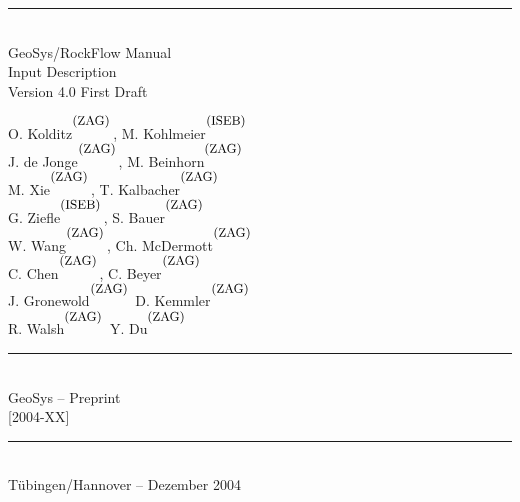 \begin{center}
\vspace{1cm}

%


\rule{12cm}{.15mm}
\\[10mm]
{\TibSF GeoSys/RockFlow Manual \\[3mm]
 Input Description \\[3mm]
 Version 4.0 First Draft \\[7mm]
}


{
%
\def \MarkISEB {$^{^{^{\small\mbox{(ISEB)}}}}$}
\def \MarkZAG {$^{^{^{\small\mbox{(ZAG)}}}}$}
{\TibsF O. Kolditz\MarkZAG,  %
        M. Kohlmeier\MarkISEB   %
 \\[2mm]
        J. de Jonge\MarkZAG,    %
        M. Beinhorn\MarkZAG     %
 \\[2mm]
        M. Xie\MarkZAG,         %
        T. Kalbacher\MarkZAG    %
 \\[2mm]
        G. Ziefle\MarkISEB,     %
        S. Bauer\MarkZAG        %
 \\[2mm]
        W. Wang\MarkZAG,        %
        Ch. McDermott\MarkZAG   %
 \\[2mm]
        C. Chen\MarkZAG,        %
        C. Beyer\MarkZAG        %
 \\[2mm]
        J. Gronewold\MarkZAG    %
        D. Kemmler\MarkZAG      %
 \\[2mm]
        R. Walsh\MarkZAG        %
        Y. Du\MarkZAG           %
\\[8mm]
}
%
}
\rule{12cm}{0.15mm}
\\[7mm]

%
\vfill
%
{\TibSF GeoSys -- Preprint
\\[2mm]
[2004-XX] }
\\[6mm]

\rule{7cm}{.15mm}  \\[6mm]

{\TibsF T\"{u}bingen/Hannover -- Dezember 2004}

\end{center}
\newpage
